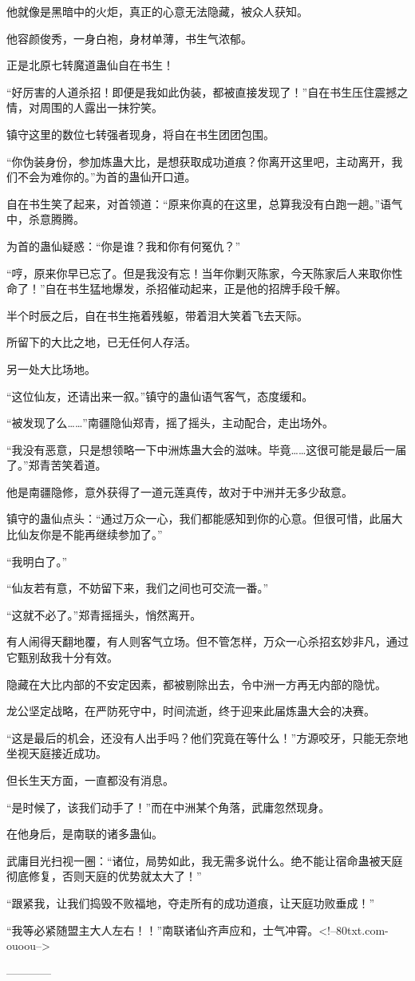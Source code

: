 \begin{this_body}
他就像是黑暗中的火炬，真正的心意无法隐藏，被众人获知。

他容颜俊秀，一身白袍，身材单薄，书生气浓郁。

正是北原七转魔道蛊仙自在书生！

“好厉害的人道杀招！即便是我如此伪装，都被直接发现了！”自在书生压住震撼之情，对周围的人露出一抹狞笑。

镇守这里的数位七转强者现身，将自在书生团团包围。

“你伪装身份，参加炼蛊大比，是想获取成功道痕？你离开这里吧，主动离开，我们不会为难你的。”为首的蛊仙开口道。

自在书生笑了起来，对首领道：“原来你真的在这里，总算我没有白跑一趟。”语气中，杀意腾腾。

为首的蛊仙疑惑：“你是谁？我和你有何冤仇？”

“哼，原来你早已忘了。但是我没有忘！当年你剿灭陈家，今天陈家后人来取你性命了！”自在书生猛地爆发，杀招催动起来，正是他的招牌手段千解。

半个时辰之后，自在书生拖着残躯，带着泪大笑着飞去天际。

所留下的大比之地，已无任何人存活。

另一处大比场地。

“这位仙友，还请出来一叙。”镇守的蛊仙语气客气，态度缓和。

“被发现了么……”南疆隐仙郑青，摇了摇头，主动配合，走出场外。

“我没有恶意，只是想领略一下中洲炼蛊大会的滋味。毕竟……这很可能是最后一届了。”郑青苦笑着道。

他是南疆隐修，意外获得了一道元莲真传，故对于中洲并无多少敌意。

镇守的蛊仙点头：“通过万众一心，我们都能感知到你的心意。但很可惜，此届大比仙友你是不能再继续参加了。”

“我明白了。”

“仙友若有意，不妨留下来，我们之间也可交流一番。”

“这就不必了。”郑青摇摇头，悄然离开。

有人闹得天翻地覆，有人则客气立场。但不管怎样，万众一心杀招玄妙非凡，通过它甄别敌我十分有效。

隐藏在大比内部的不安定因素，都被剔除出去，令中洲一方再无内部的隐忧。

龙公坚定战略，在严防死守中，时间流逝，终于迎来此届炼蛊大会的决赛。

“这是最后的机会，还没有人出手吗？他们究竟在等什么！”方源咬牙，只能无奈地坐视天庭接近成功。

但长生天方面，一直都没有消息。

“是时候了，该我们动手了！”而在中洲某个角落，武庸忽然现身。

在他身后，是南联的诸多蛊仙。

武庸目光扫视一圈：“诸位，局势如此，我无需多说什么。绝不能让宿命蛊被天庭彻底修复，否则天庭的优势就太大了！”

“跟紧我，让我们捣毁不败福地，夺走所有的成功道痕，让天庭功败垂成！”

“我等必紧随盟主大人左右！！”南联诸仙齐声应和，士气冲霄。<!--80txt.com-ouoou-->

------------

\end{this_body}

